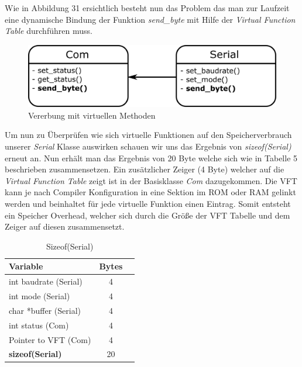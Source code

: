 \documentclass[MES,Master,ngerman]{twbook}%
\begin{document}
Wie in Abbildung 31 ersichtlich besteht nun das Problem das man zur Laufzeit eine dynamische Bindung der Funktion \textit{send\_byte} mit Hilfe der \textit{Virtual Function Table} durchführen muss. 

\begin{figure}[h]
	\centering
	\includegraphics[scale=0.65]{../Grafiken/Virtuelle_Funktionen.png}
	\caption{Vererbung mit virtuellen Methoden}
	\label{fig:35}
\end{figure}

Um nun zu Überprüfen wie sich virtuelle Funktionen auf den Speicherverbrauch unserer \textit{Serial} Klasse auswirken schauen wir uns das Ergebnis von \textit{sizeof(Serial)} erneut an. Nun erhält man das Ergebnis von 20 Byte welche sich wie in Tabelle 5 beschrieben zusammensetzen. Ein zusätzlicher Zeiger (4 Byte) welcher auf die \textit{Virtual Function Table} zeigt ist in der Basisklasse \textit{Com} dazugekommen. Die VFT kann je nach Compiler Konfiguration in eine Sektion im ROM oder RAM gelinkt werden und beinhaltet für jede virtuelle Funktion einen Eintrag. Somit entsteht ein Speicher Overhead, welcher sich durch die Größe der VFT Tabelle und dem Zeiger auf diesen zusammensetzt. 

\begin{table}[!htb]
	\centering
	\begin{tabular}{| l | c | r |}
		\hline
		\textbf{Variable}   & \textbf{Bytes}    \\ \hline
		int baudrate (Serial)        & 4				    \\ \hline
		int mode (Serial)            & 4 	    		\\ \hline
		char *buffer (Serial)       & 4		            \\ \hline
		int status (Com)       & 4  			    \\ \hline
		Pointer to VFT (Com)       & 4  			    \\ \hline
		\textbf{sizeof(Serial)} & 20 \\ \hline
		
		
	\end{tabular}
	
	\caption{Sizeof(Serial)}
	\label{tbl:5}
\end{table}
\end{document}
